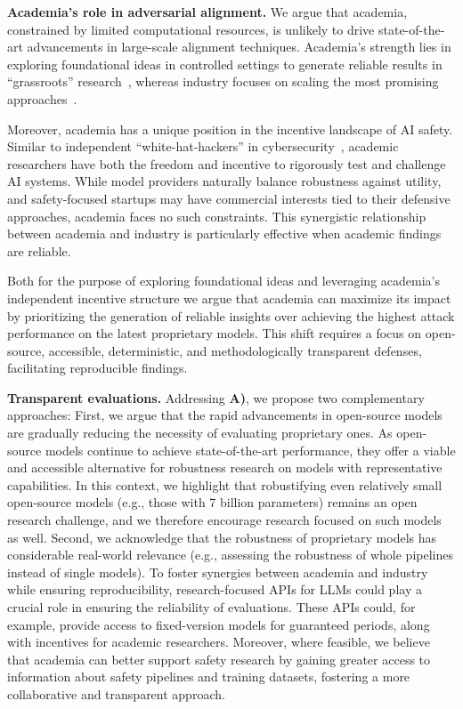\textbf{Academia's role in adversarial alignment.} We argue that academia, constrained by limited computational resources, is unlikely to drive state-of-the-art advancements in large-scale alignment techniques. 
Academia's strength lies in exploring foundational ideas in controlled settings to generate reliable results in ``grassroots'' research~\cite{krizhevsky2012imagenet, vaswani2017attention}, whereas industry focuses on scaling the most promising approaches~\cite{brown2020language}. 

Moreover, academia has a unique position in the incentive landscape of AI safety. Similar to independent ``white-hat-hackers'' in cybersecurity~\cite{caldwell2011ethical}, academic researchers have both the freedom and incentive to rigorously test and challenge AI systems. While model providers naturally balance robustness against utility, and safety-focused startups may have commercial interests tied to their defensive approaches, academia faces no such constraints. This synergistic relationship between academia and industry is particularly effective when academic findings are reliable.

Both for the purpose of exploring foundational ideas and leveraging academia's independent incentive structure we argue that academia can maximize its impact by prioritizing the generation of reliable insights over achieving the highest attack performance on the latest proprietary models. This shift requires a focus on open-source, accessible, deterministic, and methodologically transparent defenses, facilitating reproducible findings. %

\textbf{Transparent evaluations.} Addressing \textbf{A)}, we propose two complementary approaches: First, we argue that the rapid advancements in open-source models are gradually reducing the necessity of evaluating proprietary ones. As open-source models continue to achieve state-of-the-art performance, they offer a viable and accessible alternative for robustness research on models with representative capabilities.
In this context, we highlight that robustifying even relatively small open-source models (e.g., those with 7 billion parameters) remains an open research challenge, and we therefore encourage research focused on such models as well. Second, we acknowledge that the robustness of proprietary models has considerable real-world relevance (e.g., assessing the robustness of whole pipelines instead of single models). To foster synergies between academia and industry while ensuring reproducibility, research-focused APIs for LLMs could play a crucial role in ensuring the reliability of evaluations. These APIs could, for example, provide access to fixed-version models for guaranteed periods, along with incentives for academic researchers. Moreover, where feasible, we believe that academia can better support safety research by gaining greater access to information about safety pipelines and training datasets, fostering a more collaborative and transparent approach.

